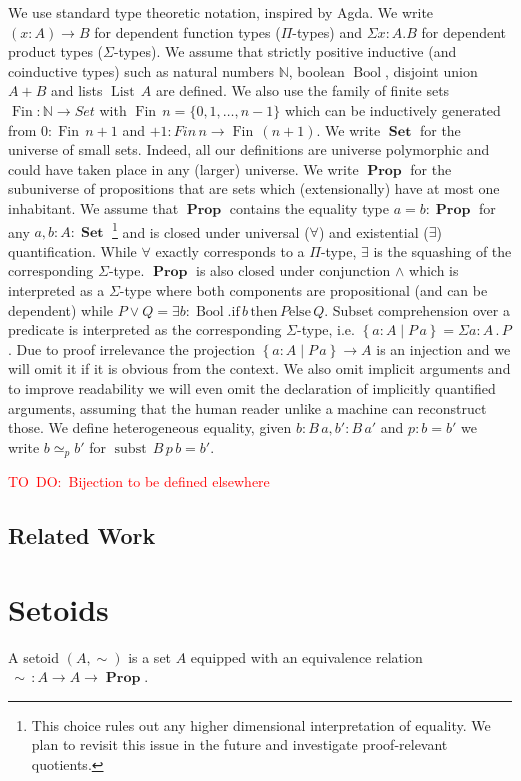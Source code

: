 \documentclass[envcountsame]{llncs}
\newcommand{\todo}[1]{\textcolor{red}{TO~DO:~#1}}
\newcommand{\N}{\mathbb{N}}
\newcommand{\dotop}{\mathrel{.}}
\providecommand{\set}  [1]{\left\{#1\right\}}
\DeclareMathOperator{\Prop}{\mathbf{Prop}}
\DeclareMathOperator{\Set}{\mathbf{Set}}
\DeclareMathOperator{\Bool}{Bool}
\DeclareMathOperator{\subst}{subst}
\DeclareMathOperator{\List}{List}
\DeclareMathOperator{\Fin}{Fin}
\renewcommand{\equiv}{=}
\begin{document}
We use standard type theoretic notation, inspired by Agda. We write
$(x : A) \to B$ for dependent function types ($\Pi$-types) and $\Sigma
x:A.B$ for dependent product types ($\Sigma$-types). We assume that
strictly positive inductive (and coinductive types) such as natural
numbers $\N$, boolean $\Bool$, disjoint union $A + B$ and lists
$\List\,A$ are defined. We also use the family of finite sets $\Fin :
\N \to Set$ with $\Fin\,n = \{ 0 , 1, \dots, n-1\}$ which can be
inductively generated from $0 : \Fin\,n+1$ and $+1 : Fin\,n \to
\Fin\,(n+1) $. We write $\Set$ for the universe of small sets. Indeed,
all our definitions are universe polymorphic and could have taken
place in any (larger) universe.  We write $\Prop$ for the subuniverse
of propositions that are sets which (extensionally) have at most one
inhabitant. We assume that $\Prop$ contains the equality type $a = b : \Prop$ for any $a,b : A : \Set$ \footnote{This choice
  rules out any higher dimensional interpretation of equality. We plan
  to revisit this issue in the future and investigate proof-relevant
  quotients.}  and is closed under universal ($\forall$) and
existential ($\exists$) quantification. While $\forall$ exactly
corresponds to a $\Pi$-type, $\exists$ is the squashing of the
corresponding $\Sigma$-type.  $\Prop$ is also closed under conjunction
$\wedge$ which is interpreted as a $\Sigma$-type where both components
are propositional (and can be dependent) while $P \vee Q = \exists
b:\Bool.\mathrm{if}\,b\,\mathrm{then}\,P\mathrm{else}\,Q$.  Subset
comprehension over a predicate is interpreted as the corresponding
$\Sigma$-type, i.e. $\set{a:A\mid P\,a}=\Sigma a:A \dotop P$. Due to
proof irrelevance the projection $\set{a:A\mid P\,a} \to A$ is an
injection and we will omit it if it is obvious from the context. We
also omit implicit arguments and to improve readability we will even
omit the declaration of implicitly quantified arguments, assuming that
the human reader unlike a machine can reconstruct those. We define
heterogeneous equality, given $b : B\, a, b' :
B\,a'$ and $p : b = b'$ we write $b \simeq_{p} b'$ for
$\subst\,B\,p\,b \equiv b'$.

\todo{Bijection to be defined elsewhere}

\subsection{Related Work}
\label{sec:related-work}


\section{Setoids}\label{sec:setoids}
\begin{definition}
A setoid $(A,\sim)$ is a set $A$ equipped with an equivalence relation ${\,\sim\,}\colon A \to A \to \Prop$.
\end{definition}
\end{document}
